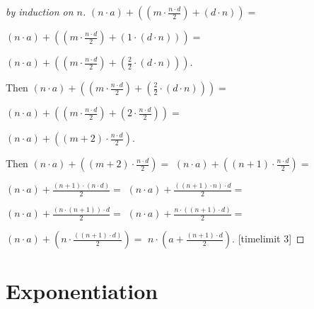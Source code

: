 \documentclass{article}
\begin{document}
\begin{forthel}
\begin{proof}[by induction on $n$]
$(n \cdot a) +  ((m \cdot \frac{n \cdot d}{2}) + (d \cdot n))=$

$(n \cdot a) +  ((m \cdot \frac{n \cdot d}{2}) + (1 \cdot (d \cdot n)))=$

$(n \cdot a) +  ((m \cdot \frac{n \cdot d}{2}) + (\frac{2}{2} \cdot (d \cdot n)))$.

Then $(n \cdot a) +  ((m \cdot \frac{n \cdot d}{2}) + (\frac{2}{2} \cdot (d \cdot n))) =$

$(n \cdot a) +  ((m \cdot \frac{n \cdot d}{2}) + (2 \cdot \frac{n \cdot d}{2})) =$

$(n \cdot a) +  ((m +2) \cdot \frac{n \cdot d}{2})$.

Then $(n \cdot a) + ((m +2) \cdot \frac{n \cdot d}{2}) =$
$(n \cdot a) +  ((n+1) \cdot \frac{n \cdot d}{2}) =$

$(n \cdot a) +  \frac{(n+1) \cdot (n \cdot d)}{2} =$
$(n \cdot a) +  \frac{((n+1) \cdot n) \cdot d}{2} =$

$(n \cdot a) +  \frac{(n \cdot (n+1)) \cdot d}{2} =$
$(n \cdot a) +  \frac{n \cdot ((n+1) \cdot d)}{2} =$

$(n \cdot a) +  (n \cdot \frac{((n+1) \cdot d)}{2}) =$
$n \cdot ( a + \frac{(n + 1) \cdot d}{2})$.
[timelimit 3]
\end{proof}
\end{forthel}


\section{Exponentiation}
\end{document}
